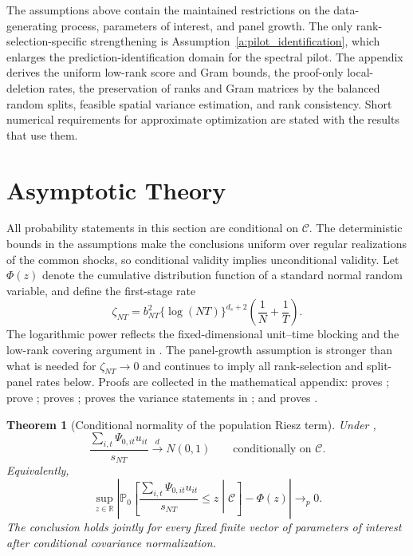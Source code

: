 \documentclass[11pt]{article}
\numberwithin{equation}{section}
\newtheorem{theorem}{Theorem}
\theoremstyle{remark}
\newcommand{\R}{\mathbb R}
\newcommand{\Pzero}{\mathbb P_0}
\begin{document}
The assumptions above contain the maintained restrictions on the data-generating process, parameters of interest, and panel growth. The only rank-selection-specific strengthening is Assumption~\ref{a:pilot_identification}, which enlarges the prediction-identification domain for the spectral pilot. The appendix derives the uniform low-rank score and Gram bounds, the proof-only local-deletion rates, the preservation of ranks and Gram matrices by the balanced random splits, feasible spatial variance estimation, and rank consistency. Short numerical requirements for approximate optimization are stated with the results that use them.


\section{Asymptotic Theory}
\label{sec:theory}

All probability statements in this section are conditional on $\mathscr C$. The deterministic bounds in the assumptions make the conclusions uniform over regular realizations of the common shocks, so conditional validity implies unconditional validity. Let $\Phi(z)$ denote the cumulative distribution function of a standard normal random variable, and define the first-stage rate
$$
\zeta_{NT}
=
b_{NT}^2\{\log(NT)\}^{d_s+2}
\left(\frac1N+\frac1T\right).
$$
The logarithmic power reflects the fixed-dimensional unit--time blocking and the low-rank covering argument in . The panel-growth assumption is stronger than what is needed for $\zeta_{NT}\to0$ and continues to imply all rank-selection and split-panel rates below.
Proofs are collected in the mathematical appendix:  proves ;  prove ;  proves ;  proves the variance statements in ; and  proves .

\begin{theorem}[Conditional normality of the population Riesz term]
\label{thm:population_clt}
Under ,
$$
\frac{\sum_{i,t}\Psi_{0,it}u_{it}}{s_{NT}}
\xrightarrow{d}
N(0,1)
\qquad
\text{conditionally on }\mathscr C.
$$
Equivalently,
\begin{equation}
\label{eq:conditional_clt}
\sup_{z\in\R}
\left|
\Pzero\!\left[
\frac{\sum_{i,t}\Psi_{0,it}u_{it}}{s_{NT}}\le z
\middle|\mathscr C
\right]
-\Phi(z)
\right|
\longrightarrow_p0.
\end{equation}
The conclusion holds jointly for every fixed finite vector of parameters of interest after conditional covariance normalization.
\end{theorem}
\end{document}
